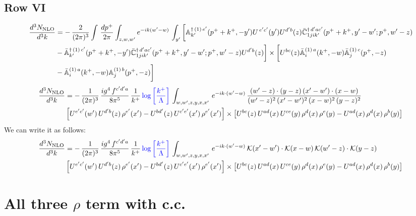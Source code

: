 \documentclass[9pt]{article}
\def\mf#1{\mathbb{#1}}
\numberwithin{equation}{section}
\begin{document}
\subsection{Row VI}
\begin{align}
     \frac{d^{3}N_{\rm NLO}}{d^{3}k} & =   -\,\frac{2}{(2\pi)^{3}} \int\, \frac{dp^{+}}{2\pi}\int_{z,w,w^{\prime}} e^{-ik(w^{\prime}-w)}\, \int_{y^{\prime}}\bigg[\mf{A}^{\dagger\, (1)\,e^{\prime}}_{k^{\prime}}(p^{+}+k^{+},-y^{\prime})U^{\, e^{\prime}c^{\prime}}(y^{\prime})U^{d^{\prime}b}(z) \Bar{\mf{C}}^{\dagger\, d^{\prime}ac^{\prime}}_{1jik^{\prime}}(p^{+}+k^{+},y^{\prime}-w^{\prime}; p^{+},w^{\prime}-z) \notag \\ & -\Bar{\mf{A}}^{\dagger\, (1)\,c^{\prime}}_{k^{\prime}}(p^{+}+k^{+},-y^{\prime})\Bar{\mf{C}}^{\dagger\, d^{\prime}ac^{\prime}}_{1jik^{\prime}}(p^{+}+k^{+},y^{\prime}-w^{\prime}; p^{+},w^{\prime}-z)U^{d^{\prime}b}(z)\bigg] \times \bigg[U^{bc}(z)\Bar{\mf{A}}^{(1)\, a}_{i}(k^{+},- w)\Bar{\mf{A}}^{(1)\, c}_{j}(p^{+},-z)\notag \\ & -\Bar{\mf{A}}^{(1)\, a}_{i}(k^{+},- w) \mf{A}^{(1)\, b}_{j}(p^{+},- z)\bigg]\nonumber
\end{align}
\begin{align}
    \frac{d^{3}N_{\rm NLO}}{d^{3}k} & = -\,\frac{1}{(2\pi)^{3}}\, \frac{ig^{4}\,f^{c'd'a}}{8\pi^{5}}\, \frac{1}{k^{+}}\,{\color{blue}\log{\left[\frac{k^{+}}{\Lambda}\right]}}\, \int_{w,w',z,y,x,x'}\, e^{-ik\cdot (w'-w)}\,\frac{(w'-z)\cdot (y-z)\,(x'-w')\cdot (x-w)}{(w'-z)^{2}\,(x'-w')^{2}\,(x-w)^{2}\,(y-z)^{2}}\notag \\ & \left[U^{e'c'}(w')\,U^{d'b}(z)\,\rho^{e'}(x')-U^{bd'}(z)\,U^{c'e'}(x')\,\rho^{e'}(x')\right]\times  \left[U^{bc}(z)\,U^{ad}(x)\,U^{ce}(y)\,\rho^{d}(x)\,\rho^{e}(y)-U^{ad}(x)\,\rho^{d}(x)\,\rho^{b}(y)\right]
\end{align}
We can write it as follows:
\begin{align}
    \frac{d^{3}N_{\rm NLO}}{d^{3}k} & = -\,\frac{1}{(2\pi)^{3}}\, \frac{ig^{4}\,f^{c'd'a}}{8\pi^{5}}\, \frac{1}{k^{+}}\,{\color{blue}\log{\left[\frac{k^{+}}{\Lambda}\right]}}\, \int_{w,w',z,y,x,x'}\, e^{-ik\cdot (w'-w)}\,\mathcal{K}(x'-w')\cdot \mathcal{K}(x-w)\,\mathcal{K}(w'-z)\cdot \mathcal{K}(y-z)\notag \\ & \left[U^{e'c'}(w')\,U^{d'b}(z)\,\rho^{e'}(x')-U^{bd'}(z)\,U^{c'e'}(x')\,\rho^{e'}(x')\right]\times  \left[U^{bc}(z)\,U^{ad}(x)\,U^{ce}(y)\,\rho^{d}(x)\,\rho^{e}(y)-U^{ad}(x)\,\rho^{d}(x)\,\rho^{b}(y)\right]
\end{align}
\section{All three $\rho$ term with c.c.}
\end{document}
